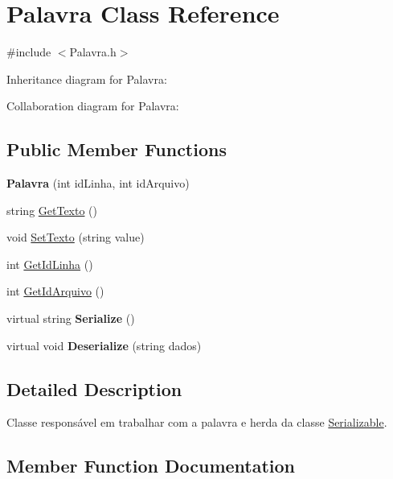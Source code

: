 \hypertarget{class_palavra}{}\section{Palavra Class Reference}
\label{class_palavra}


{\ttfamily \#include $<$Palavra.\+h$>$}



Inheritance diagram for Palavra\+:


Collaboration diagram for Palavra\+:
\subsection*{Public Member Functions}
\begin{DoxyCompactItemize}
\item 
{\bfseries Palavra} (int id\+Linha, int id\+Arquivo)\hypertarget{class_palavra_a7627de0f039cf0738dcaa7d138037b7f}{}\label{class_palavra_a7627de0f039cf0738dcaa7d138037b7f}

\item 
string \hyperlink{class_palavra_a63c622775e858a590e075b4daef0e47c}{Get\+Texto} ()
\item 
void \hyperlink{class_palavra_a552d7d9a0e8a8572587b00e1c007678a}{Set\+Texto} (string value)
\item 
int \hyperlink{class_palavra_acc2f956345fd5e37fc711f52dde1a8b2}{Get\+Id\+Linha} ()
\item 
int \hyperlink{class_palavra_a66e47eec1ccfa63d674f4e7162dd5a86}{Get\+Id\+Arquivo} ()
\item 
virtual string {\bfseries Serialize} ()\hypertarget{class_palavra_a6b3e77696c92dee39014caccc8aad130}{}\label{class_palavra_a6b3e77696c92dee39014caccc8aad130}

\item 
virtual void {\bfseries Deserialize} (string dados)\hypertarget{class_palavra_a0efa0dd0860ef7b1d318f52060b125ec}{}\label{class_palavra_a0efa0dd0860ef7b1d318f52060b125ec}

\end{DoxyCompactItemize}


\subsection{Detailed Description}
Classe responsável em trabalhar com a palavra e herda da classe \hyperlink{class_serializable}{Serializable}. 

\subsection{Member Function Documentation}
